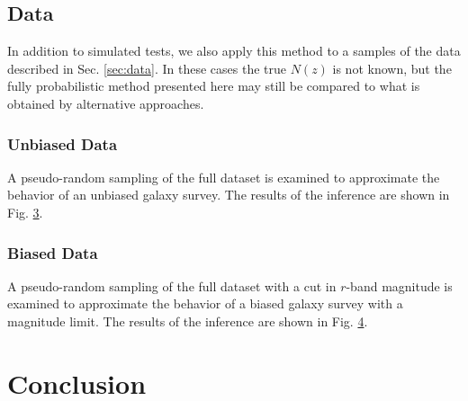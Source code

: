 \documentclass[preprint]{aastex}
\begin{document}
\begin{figure}
\caption{}
\label{fig:intb-samp}
\end{figure}

\begin{figure}
\caption{}
\label{fig:intb-comp}
\end{figure}

\clearpage
\subsection{Data}
\label{sec:boss}

In addition to simulated tests, we also apply this method to a samples of the 
data described in Sec. \ref{sec:data}.  In these cases the true $N(z)$ is not 
known, but the fully probabilistic method presented here may still be compared 
to what is obtained by alternative approaches.

\subsubsection{Unbiased Data}
\label{sec:unbiased}

A pseudo-random sampling of the full dataset is examined to approximate the 
behavior of an unbiased galaxy survey.  The results of the inference are shown 
in Fig. \ref{fig:dataparam}.

\begin{figure}
\caption{}
\label{fig:dataparam}
\end{figure}

\subsubsection{Biased Data}
\label{sec:biased}

A pseudo-random sampling of the full dataset with a cut in $r$-band magnitude 
is examined to approximate the behavior of a biased galaxy survey with a 
magnitude limit.  The results of the inference are shown in Fig. 
\ref{fig:biasparam}.

\begin{figure}
\caption{}
\label{fig:biasparam}
\end{figure}

\clearpage
\section{Conclusion}
\label{sec:con}
\end{document}
